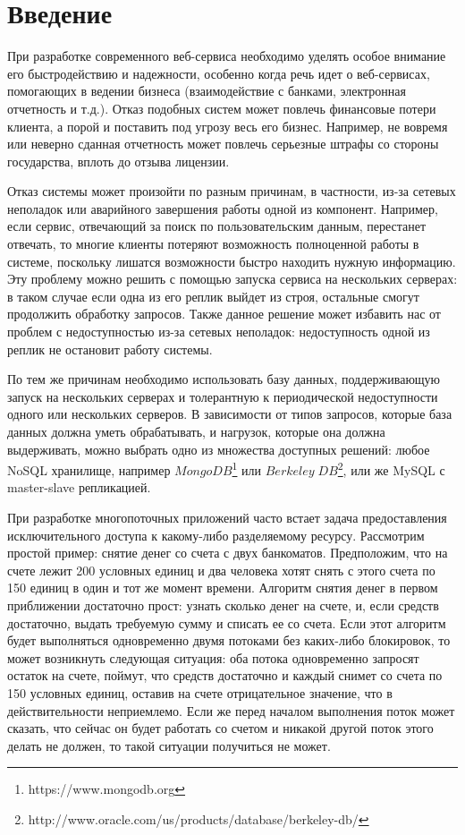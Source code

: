 \section{Введение}

При разработке современного веб-сервиса необходимо уделять особое внимание его быстродействию и надежности, особенно когда речь идет о веб-сервисах, помогающих в ведении бизнеса (взаимодействие с банками, электронная отчетность и т.д.). Отказ подобных систем может повлечь финансовые потери клиента, а порой и поставить под угрозу весь его бизнес. Например, не вовремя или неверно сданная отчетность может повлечь серьезные штрафы со стороны государства, вплоть до отзыва лицензии.

Отказ системы может произойти по разным причинам, в частности, из-за сетевых неполадок или аварийного завершения работы одной из компонент. Например, если сервис, отвечающий за поиск по пользовательским данным, перестанет отвечать, то многие клиенты потеряют возможность полноценной работы в системе, поскольку лишатся возможности быстро находить нужную информацию. Эту проблему можно решить с помощью запуска сервиса на нескольких серверах: в таком случае если одна из его реплик выйдет из строя, остальные смогут продолжить обработку запросов. Также данное решение может избавить нас от проблем с недоступностью из-за сетевых неполадок: недоступность одной из реплик не остановит работу системы.

По тем же причинам необходимо использовать базу данных, поддерживающую запуск на нескольких серверах и толерантную к периодической недоступности одного или нескольких серверов. В зависимости от типов запросов, которые база данных должна уметь обрабатывать, и нагрузок, которые она должна выдерживать, можно выбрать одно из множества доступных решений: любое NoSQL хранилище, например $MongoDB$\footnote{https://www.mongodb.org} или $Berkeley\;DB$\footnote{http://www.oracle.com/us/products/database/berkeley-db/}, или же MySQL с master-slave репликацией.

При разработке многопоточных приложений часто встает задача предоставления исключительного доступа к какому-либо разделяемому ресурсу. Рассмотрим простой пример: снятие денег со счета с двух банкоматов. Предположим, что на счете лежит 200 условных единиц и два человека хотят снять с этого счета по 150 единиц в один и тот же момент времени. Алгоритм снятия денег в первом приближении достаточно прост: узнать сколько денег на счете, и, если средств достаточно, выдать требуемую сумму и списать ее со счета. Если этот алгоритм будет выполняться одновременно двумя потоками без каких-либо блокировок, то может возникнуть следующая ситуация: оба потока одновременно запросят остаток на счете, поймут, что средств достаточно и каждый снимет со счета по 150 условных единиц, оставив на счете отрицательное значение, что в действительности неприемлемо. Если же перед началом выполнения поток может сказать, что сейчас он будет работать со счетом и никакой другой поток этого делать не должен, то такой ситуации получиться не может.


